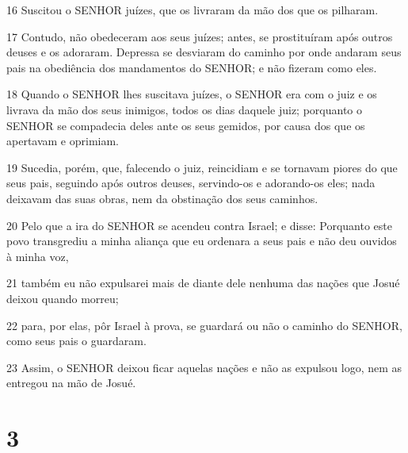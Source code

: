 \par 16 Suscitou o SENHOR juízes, que os livraram da mão dos que os pilharam.
\par 17 Contudo, não obedeceram aos seus juízes; antes, se prostituíram após outros deuses e os adoraram. Depressa se desviaram do caminho por onde andaram seus pais na obediência dos mandamentos do SENHOR; e não fizeram como eles.
\par 18 Quando o SENHOR lhes suscitava juízes, o SENHOR era com o juiz e os livrava da mão dos seus inimigos, todos os dias daquele juiz; porquanto o SENHOR se compadecia deles ante os seus gemidos, por causa dos que os apertavam e oprimiam.
\par 19 Sucedia, porém, que, falecendo o juiz, reincidiam e se tornavam piores do que seus pais, seguindo após outros deuses, servindo-os e adorando-os eles; nada deixavam das suas obras, nem da obstinação dos seus caminhos.
\par 20 Pelo que a ira do SENHOR se acendeu contra Israel; e disse: Porquanto este povo transgrediu a minha aliança que eu ordenara a seus pais e não deu ouvidos à minha voz,
\par 21 também eu não expulsarei mais de diante dele nenhuma das nações que Josué deixou quando morreu;
\par 22 para, por elas, pôr Israel à prova, se guardará ou não o caminho do SENHOR, como seus pais o guardaram.
\par 23 Assim, o SENHOR deixou ficar aquelas nações e não as expulsou logo, nem as entregou na mão de Josué.

\chapter{3}

